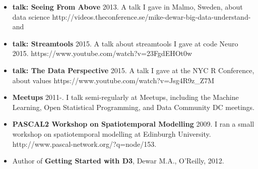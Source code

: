 \documentclass{res}
\begin{document}
\begin{resume}
\begin{itemize}
  \item {\bf talk: Seeing From Above} 2013. A talk I gave in Malmo, Sweden, about data science http://videos.theconference.se/mike-dewar-big-data-understand-and 
    \item {\bf talk: Streamtools} 2015. A talk about streamtools I gave at code Neuro 2015. https://www.youtube.com/watch?v=23FgdEHOt0w
    \item {\bf talk: The Data Perspective} 2015. A talk I gave at the NYC R Conference, about values https://www.youtube.com/watch?v=Jsg4R9z_Z7M 

  \item {\bf Meetups} 2011-. I talk semi-regularly at Meetups, including the Machine Learning, Open Statistical Programming, and Data Community DC meetings.
  \item {\bf PASCAL2 Workshop on Spatiotemporal Modelling} 2009. I ran a small workshop on spatiotemporal modelling at Edinburgh University. http://www.pascal-network.org/?q=node/153.
  \item Author of {\bf Getting Started with D3}, Dewar M.A., O'Reilly, 2012.  
\end{itemize}

\end{resume}
\end{document}
